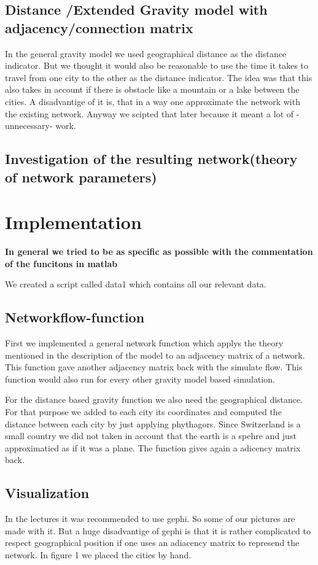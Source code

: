 \documentclass[11pt]{article}
\begin{document}
\subsection{Distance /Extended Gravity model with adjacency/connection matrix }
In the general gravity model we used geographical distance as the distance indicator. But we thought it would also be reasonable to use the time it takes to travel from one city to the other as the distance indicator. The idea was that this also takes in account if there is obstacle like a mountain or a lake between the cities. A disadvantige of it is, that in a way one approximate the network with the existing network. Anyway we scipted that later because it meant a lot of -unnecessary- work.


\subsection{Investigation of the resulting network(theory of network parameters)}



\section{Implementation}
\textbf{In general we tried to be as specific as possible with the commentation of the funcitons in matlab}

We created a script called data1 which contains all our relevant data.

\subsection{Networkflow-function}
First we implemented a general network function which applys the theory mentioned in the description of the model to an adjacency matrix of a network. This function gave another adjacency matrix back with the simulate flow. This function would also run for every other gravity model based simulation.\newline

For the distance based gravity function we also need the geographical distance. For that purpose we added to each city its coordinates and computed the distance between each city by just applying phythagors. Since Switzerland is a small country we did not taken in account that the earth is a spehre and just approximatied as if it was a plane. The function gives again a adicency matrix back.


\subsection{Visualization}
In the lectures it was recommended to use gephi. So some of our pictures are made with it. But a huge disadvantige of gephi is that it is rather complicated to respect geographical position if one uses an adiacency  matrix to represend the network. In figure 1 we placed the cities by hand.
\end{document}
